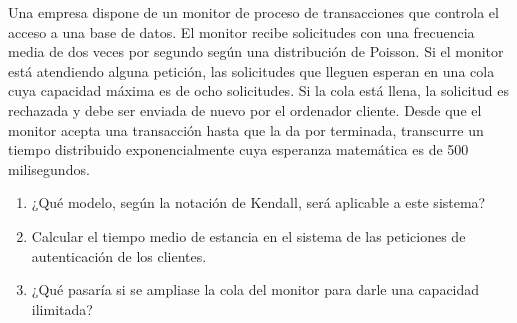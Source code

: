 \begin{problem}[26]
Una empresa dispone de un monitor de proceso de transacciones que controla el acceso a una base de datos. El monitor recibe solicitudes con una frecuencia media de dos veces por segundo según una distribución de Poisson. Si el monitor está atendiendo alguna petición, las solicitudes que lleguen esperan en una cola cuya capacidad máxima es de ocho solicitudes. Si la cola está llena, la solicitud es rechazada y debe ser enviada de nuevo por el ordenador cliente.
Desde que el monitor acepta una transacción hasta que la da por terminada, transcurre un tiempo distribuido exponencialmente cuya esperanza matemática es de 500 milisegundos.
\begin{enumerate}
\item¿Qué modelo, según la notación de Kendall, será aplicable a este sistema?
\item Calcular el tiempo medio de estancia en el sistema de las peticiones de autenticación de los clientes.
\item ¿Qué pasaría si se ampliase la cola del monitor para darle una capacidad ilimitada?
\end{enumerate}

\solution

\end{problem}

